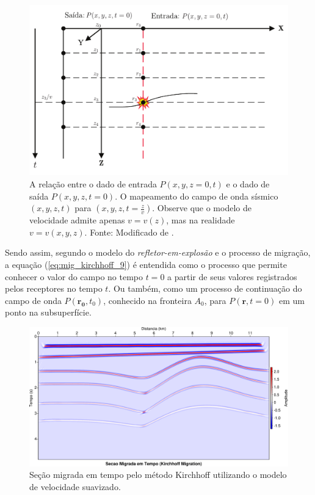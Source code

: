 \begin{figure}[H]
\centering
\includegraphics[totalheight=9.0cm]{figuras/cap3/mapeamento_mig.pdf}
\caption{A relação entre o dado de entrada $P(x,y,z=0,t)$ e o dado de saída $P(x,y,z,t=0)$. 
O mapeamento do campo de onda sísmico $(x,y,z,t)$ para $(x,y,z,t=\frac{z}{v})$. 
Observe que o modelo de velocidade admite apenas $v=v(z)$, mas na realidade $v=v(x,y,z)$.
Fonte: Modificado de \citep{Schneider(1978)}.}
\label{fig:mapeamento_mig}
\end{figure}

Sendo assim, segundo o modelo do \textit{refletor-em-explosão} e o processo de migração, a equação (\ref{eq:mig_kirchhoff_9}) é entendida como o processo que permite conhecer o valor do campo no tempo $t=0$ a partir de seus valores registrados pelos receptores no tempo $t$. 
Ou também, como um processo de continuação do campo de onda $P(\mathbf{r_0},t_0)$, conhecido na fronteira $A_0$, para $P(\mathbf{r},t=0)$ em um ponto na subsuperfície.

\begin{landscape}
\begin{figure}[H]
\centering
\includegraphics[totalheight=14cm]{figuras/cap3/seis_mig.pdf}
\caption{Seção migrada em tempo pelo método Kirchhoff utilizando o modelo de velocidade suavizado.}
\label{fig:seis_mig}
\end{figure}
\end{landscape}

